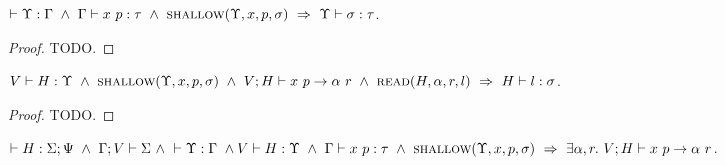\documentclass{article}
\begin{document}
\begin{lem}
  $\YWF{\Upsilon}{\Gamma}\ \land\ \PType{\Gamma}{x}{p}{\tau}\ \land\
   \Shallow{\Upsilon}{x}{p}{\sigma}\ \Rightarrow\ \Type{\Upsilon}{\sigma}{\tau}$.
\end{lem}

\begin{proof}
  TODO.
\end{proof}

\begin{lem}
  $\Type{V}{H}{\Upsilon}\ \land\ \Shallow{\Upsilon}{x}{p}{\sigma}\ \land\
   \PEval{V}{H}{x}{p}{\alpha}{r}\ \land\ \Read{H}{\alpha}{r}{l}\ \Rightarrow\
   \Type{H}{l}{\sigma}$.
\end{lem}

\begin{proof}
  TODO.
\end{proof}

\begin{lem}
  $\HWF{H}{\Sigma}{\Psi}\ \land\ \SWF{\Gamma}{V}{\Sigma}\ \land\
   \YWF{\Upsilon}{\Gamma}\ \land\ \\ \Type{V}{H}{\Upsilon}\ \land\ 
   \PType{\Gamma}{x}{p}{\tau}\ \land\ \Shallow{\Upsilon}{x}{p}{\sigma}\ 
   \Rightarrow\ \exists \alpha, r.\ \PEval{V}{H}{x}{p}{\alpha}{r}$.
\end{lem}
\end{document}
